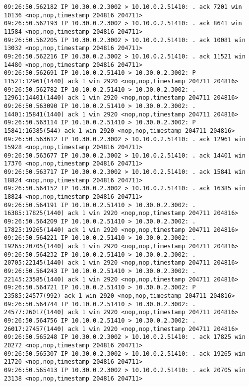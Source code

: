 \documentclass[a4paper,12pt]{article}
\begin{document}
\begin{Verbatim}
09:26:50.562182 IP 10.30.0.2.3002 > 10.10.0.2.51410: . ack 7201 win 10136 <nop,nop,timestamp 204816 204711>
09:26:50.562193 IP 10.30.0.2.3002 > 10.10.0.2.51410: . ack 8641 win 11584 <nop,nop,timestamp 204816 204711>
09:26:50.562205 IP 10.30.0.2.3002 > 10.10.0.2.51410: . ack 10081 win 13032 <nop,nop,timestamp 204816 204711>
09:26:50.562216 IP 10.30.0.2.3002 > 10.10.0.2.51410: . ack 11521 win 14480 <nop,nop,timestamp 204816 204711>
09:26:50.562691 IP 10.10.0.2.51410 > 10.30.0.2.3002: P 11521:12961(1440) ack 1 win 2920 <nop,nop,timestamp 204711 204816>
09:26:50.562782 IP 10.10.0.2.51410 > 10.30.0.2.3002: . 12961:14401(1440) ack 1 win 2920 <nop,nop,timestamp 204711 204816>
09:26:50.563090 IP 10.10.0.2.51410 > 10.30.0.2.3002: . 14401:15841(1440) ack 1 win 2920 <nop,nop,timestamp 204711 204816>
09:26:50.563114 IP 10.10.0.2.51410 > 10.30.0.2.3002: P 15841:16385(544) ack 1 win 2920 <nop,nop,timestamp 204711 204816>
09:26:50.563612 IP 10.30.0.2.3002 > 10.10.0.2.51410: . ack 12961 win 15928 <nop,nop,timestamp 204816 204711>
09:26:50.563677 IP 10.30.0.2.3002 > 10.10.0.2.51410: . ack 14401 win 17376 <nop,nop,timestamp 204816 204711>
09:26:50.563717 IP 10.30.0.2.3002 > 10.10.0.2.51410: . ack 15841 win 18824 <nop,nop,timestamp 204816 204711>
09:26:50.564152 IP 10.30.0.2.3002 > 10.10.0.2.51410: . ack 16385 win 18824 <nop,nop,timestamp 204816 204711>
09:26:50.564191 IP 10.10.0.2.51410 > 10.30.0.2.3002: . 16385:17825(1440) ack 1 win 2920 <nop,nop,timestamp 204711 204816>
09:26:50.564209 IP 10.10.0.2.51410 > 10.30.0.2.3002: . 17825:19265(1440) ack 1 win 2920 <nop,nop,timestamp 204711 204816>
09:26:50.564221 IP 10.10.0.2.51410 > 10.30.0.2.3002: . 19265:20705(1440) ack 1 win 2920 <nop,nop,timestamp 204711 204816>
09:26:50.564232 IP 10.10.0.2.51410 > 10.30.0.2.3002: . 20705:22145(1440) ack 1 win 2920 <nop,nop,timestamp 204711 204816>
09:26:50.564243 IP 10.10.0.2.51410 > 10.30.0.2.3002: . 22145:23585(1440) ack 1 win 2920 <nop,nop,timestamp 204711 204816>
09:26:50.564721 IP 10.10.0.2.51410 > 10.30.0.2.3002: P 23585:24577(992) ack 1 win 2920 <nop,nop,timestamp 204711 204816>
09:26:50.564744 IP 10.10.0.2.51410 > 10.30.0.2.3002: . 24577:26017(1440) ack 1 win 2920 <nop,nop,timestamp 204711 204816>
09:26:50.564756 IP 10.10.0.2.51410 > 10.30.0.2.3002: . 26017:27457(1440) ack 1 win 2920 <nop,nop,timestamp 204711 204816>
09:26:50.565248 IP 10.30.0.2.3002 > 10.10.0.2.51410: . ack 17825 win 20272 <nop,nop,timestamp 204816 204711>
09:26:50.565307 IP 10.30.0.2.3002 > 10.10.0.2.51410: . ack 19265 win 21720 <nop,nop,timestamp 204816 204711>
09:26:50.565413 IP 10.30.0.2.3002 > 10.10.0.2.51410: . ack 20705 win 23138 <nop,nop,timestamp 204816 204711>

\end{Verbatim}
\end{document}

